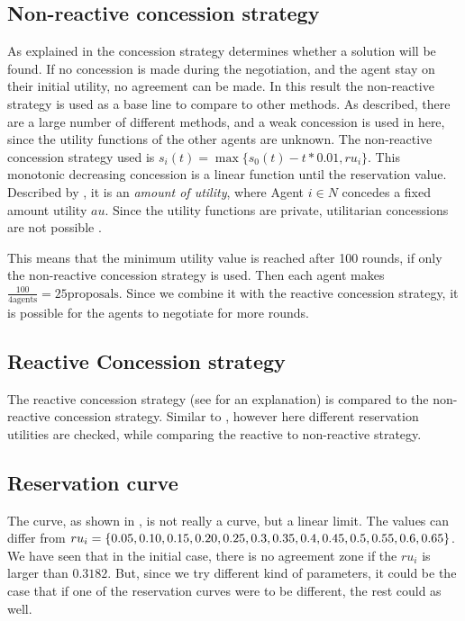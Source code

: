 \subsection{Non-reactive concession strategy}
As explained in  the concession strategy determines whether a solution will be found. If no concession is made during the negotiation, and the agent stay on their initial utility, no agreement can be made. In this result the non-reactive strategy is used as a base line to compare to other methods. As described, there are a large number of different methods, and a weak concession is used in here, since the utility functions of the other agents are unknown. The non-reactive concession strategy used is $s_i(t) = \max \{s_0(t) - t * 0.01, ru_i\}$. This monotonic decreasing concession is a linear function until the reservation value. Described by \cite{wu2009efficient}, it is an \textit{amount of utility}, where Agent $ i \in N$ concedes a fixed amount utility $au$. Since the utility functions are private, utilitarian concessions are not possible \citep{endriss2006monotonic}. 

This means that the minimum utility value is reached after 100 rounds, if only the non-reactive concession strategy is used. Then each agent makes $\frac{100}{4 \text{agents}} = 25 \text{proposals}$. Since we combine it with the reactive concession strategy, it is possible for the agents to negotiate for more rounds.

\subsection{Reactive Concession strategy}
The reactive concession strategy (see  for an explanation) is compared to the non-reactive concession strategy. Similar to \citet{zheng2015automated}, however here different reservation utilities are checked, while comparing the reactive to non-reactive strategy.

\subsection{Reservation curve}
The curve, as shown in , is not really a curve, but a linear limit. The values can differ from 	
$ru_i = \{0.05, 0.10, 0.15, 0.20, 0.25, 0.3, 0.35, 0.4, 0.45, 0.5, \\0.55, 0.6, 0.65\}$. We have seen that in the initial case, there is no agreement zone if the $ru_i$ is larger than $0.3182$. But, since we try different kind of parameters, it could be the case that if one of the reservation curves were to be different, the rest could as well. 


